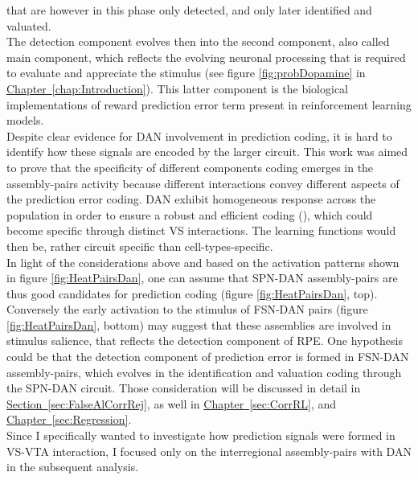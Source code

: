 that are however in this phase only detected, and only later identified and valuated.\\The detection component evolves then into the second component, also called main component, which reflects the evolving neuronal processing that is required to evaluate and appreciate the stimulus (see figure \ref{fig:probDopamine} in \hyperref[chap:Introduction]{Chapter~\ref*{chap:Introduction}}). This latter component is the biological implementations of reward prediction error term present in reinforcement learning models.\\Despite clear evidence for DAN involvement in prediction coding, it is hard to identify how these signals are encoded by the larger circuit. This work was aimed to prove that the specificity of different components coding emerges in the assembly-pairs activity because different interactions convey different aspects of the prediction error coding. DAN exhibit homogeneous response across the population in order to ensure a robust and efficient coding (\cite{UchidaDop}), which could become specific through distinct VS interactions. The learning functions would then be, rather circuit specific than cell-types-specific.\\In light of the considerations above and based on the activation patterns shown in figure \ref{fig:HeatPairsDan}, one can assume that SPN-DAN assembly-pairs are thus good candidates for prediction coding (figure \ref{fig:HeatPairsDan}, top). Conversely the early activation to the stimulus of FSN-DAN pairs (figure \ref{fig:HeatPairsDan}, bottom) may suggest that these assemblies are involved in stimulus salience, that reflects the detection component of RPE. One hypothesis could be that the detection component of prediction error is formed in FSN-DAN assembly-pairs, which evolves in the identification and valuation coding through the SPN-DAN circuit.
Those consideration will be discussed in detail in \hyperref[sec:FalseAlCorrRej]{Section~\ref*{sec:FalseAlCorrRej}}, as well in \hyperref[sec:CorrRL]{Chapter~\ref*{sec:CorrRL}}, and \hyperref[sec:Regression]{Chapter~\ref*{sec:Regression}}.\\Since I specifically wanted to investigate how prediction signals were formed in VS-VTA interaction, I focused only on the interregional assembly-pairs with DAN in the subsequent analysis.

